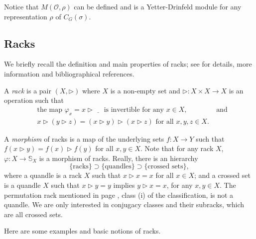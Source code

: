 \documentclass[11pt]{amsart} \textheight 22cm
\renewcommand{\^}[1]{\mbox{$^{\left( #1 \right)}$}}
\renewcommand{\_}[1]{\mbox{$_{\left( #1 \right)}$}}
\newcommand{\trid}{\triangleright}
\newcommand{\Oc}{{\mathcal O}}
\theoremstyle{plain}
\theoremstyle{definition}
\theoremstyle{remark}
\newcommand\s{\mathbb S}
\theoremstyle{remark}
\begin{document}
\medbreak Notice that $M(\Oc, \rho)$ can be defined and is a
Yetter-Drinfeld module for any representation $\rho$ of
$C_{G}(\sigma)$.


\medbreak\subsection{Racks}\label{subsect:racks} We briefly recall
the definition and main properties of racks; see \cite{AG1} for
details,  more information and bibliographical references.

\medbreak A \emph{rack} is a pair $(X,\trid)$ where $X$ is a
non-empty set and $\trid:X\times X\to X$ is an operation such that
\begin{eqnarray}
    &\text{the map }\varphi_x = x\trid \underline{\quad}
        \text{ is invertible for any }x\in X,&\ \text{and} \\
    &x \trid(y\trid z) = (x\trid y) \trid(x\trid z)
        \text{ for all }x,y,z\in X.&\label{eqn:selfdist}
\end{eqnarray}

A \emph{morphism} of racks is a map of the underlying sets $f:X\to
Y$ such that $f(x\trid y)=f(x)\trid f(y)$ for all $x,y\in X$. Note
that for any rack $X$, $\varphi:X\to\s_X$ is a morphism of racks.
Really, there is an hierarchy
$$
\{\text{racks}\} \supset \{\text{quandles}\} \supset
\{\text{crossed sets}\},
$$
where a quandle is a rack $X$ such that $x\trid x = x$ for all
$x\in X$; and a crossed set is a quandle $X$ such that $x\trid y =
y$ implies $y\trid x = x$,  for any $x, y\in X$. The permutation rack mentioned
in page \pageref{clasif:permutation-rack}, class (i) of the classification,
is not a quandle. We are only interested in conjugacy classes
and their subracks, which are all crossed sets.

\medbreak Here are some examples and basic notions of racks.
\end{document}
